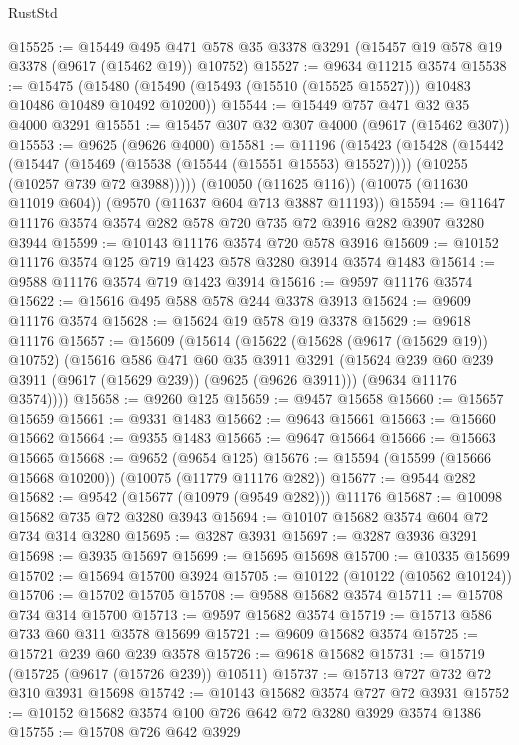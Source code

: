\begin{lexlean}{RustStd}
\begin{coremodule}
@15525 := @15449
    @495
    @471
    @578
    @35
    @3378
    @3291
    (@15457 @19 @578 @19 @3378 (@9617 (@15462 @19)) @10752)
@15527 := @9634 @11215 @3574
@15538 := @15475
    (@15480 (@15490 (@15493 (@15510 (@15525 @15527))) @10483 @10486 @10489 @10492 @10200))
@15544 := @15449 @757 @471 @32 @35 @4000 @3291
@15551 := @15457 @307 @32 @307 @4000 (@9617 (@15462 @307))
@15553 := @9625 (@9626 @4000)
@15581 := @11196
    (@15423
      (@15428
        (@15442
          (@15447 (@15469 (@15538 (@15544 (@15551 @15553) @15527))))
          (@10255 (@10257 @739 @72 @3988)))))
    (@10050 (@11625 @116))
    (@10075 (@11630 @11019 @604))
    (@9570 (@11637 @604 @713 @3887 @11193))
@15594 := @11647 @11176 @3574 @3574 @282 @578 @720 @735 @72 @3916 @282 @3907 @3280 @3944
@15599 := @10143 @11176 @3574 @720 @578 @3916
@15609 := @10152 @11176 @3574 @125 @719 @1423 @578 @3280 @3914 @3574 @1483
@15614 := @9588 @11176 @3574 @719 @1423 @3914
@15616 := @9597 @11176 @3574
@15622 := @15616 @495 @588 @578 @244 @3378 @3913
@15624 := @9609 @11176 @3574
@15628 := @15624 @19 @578 @19 @3378
@15629 := @9618 @11176
@15657 := @15609
    (@15614
      (@15622
        (@15628 (@9617 (@15629 @19)) @10752)
        (@15616
          @586
          @471
          @60
          @35
          @3911
          @3291
          (@15624 @239 @60 @239 @3911 (@9617 (@15629 @239)) (@9625 (@9626 @3911)))
          (@9634 @11176 @3574))))
@15658 := @9260 @125
@15659 := @9457 @15658
@15660 := @15657 @15659
@15661 := @9331 @1483
@15662 := @9643 @15661
@15663 := @15660 @15662
@15664 := @9355 @1483
@15665 := @9647 @15664
@15666 := @15663 @15665
@15668 := @9652 (@9654 @125)
@15676 := @15594 (@15599 (@15666 @15668 @10200)) (@10075 (@11779 @11176 @282))
@15677 := @9544 @282
@15682 := @9542 (@15677 (@10979 (@9549 @282))) @11176
@15687 := @10098 @15682 @735 @72 @3280 @3943
@15694 := @10107 @15682 @3574 @604 @72 @734 @314 @3280
@15695 := @3287 @3931
@15697 := @3287 @3936 @3291
@15698 := @3935 @15697
@15699 := @15695 @15698
@15700 := @10335 @15699
@15702 := @15694 @15700 @3924
@15705 := @10122 (@10122 (@10562 @10124))
@15706 := @15702 @15705
@15708 := @9588 @15682 @3574
@15711 := @15708 @734 @314 @15700
@15713 := @9597 @15682 @3574
@15719 := @15713 @586 @733 @60 @311 @3578 @15699
@15721 := @9609 @15682 @3574
@15725 := @15721 @239 @60 @239 @3578
@15726 := @9618 @15682
@15731 := @15719 (@15725 (@9617 (@15726 @239)) @10511)
@15737 := @15713 @727 @732 @72 @310 @3931 @15698
@15742 := @10143 @15682 @3574 @727 @72 @3931
@15752 := @10152 @15682 @3574 @100 @726 @642 @72 @3280 @3929 @3574 @1386
@15755 := @15708 @726 @642 @3929

\end{coremodule}
\end{lexlean}
